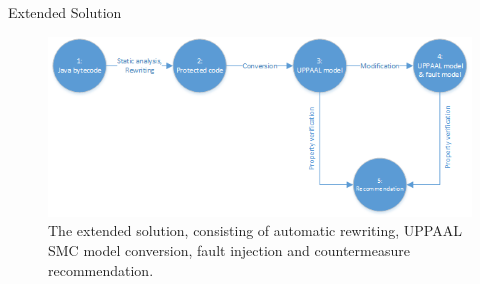\begin{frame}[fragile]{Extended Solution}
\begin{figure}
\centering
\includegraphics[scale=0.65]{figures/workflowExtended.png}
\caption{\footnotesize The extended solution, consisting of automatic rewriting, UPPAAL SMC model conversion, fault injection and countermeasure recommendation.}
\label{test}
\end{figure}
\end{frame}